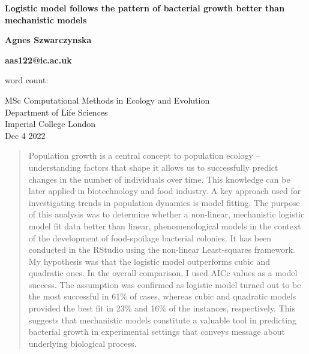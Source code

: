 \documentclass[a4paper,11pt]{article}
\newcommand{\quickwordcount}[1]{%
%
}
\begin{document}
\linespread{1.5}
\begin{titlepage}
    \begin{center}
        \vspace*{4cm}
            
        \Huge
        \textbf{Logistic model follows the pattern of bacterial growth better than mechanistic models}
            
        \vspace{0.5cm}
        \Large
            
        \vspace{1.5cm}
            
        \textbf{Agnes Szwarczynska}
        
        \textbf{aas122@ic.ac.uk}

        word count: \quickwordcount{MiniProject_Latex} 
            
        \vspace{5cm}
            
        \Large
        MSc Computational Methods in Ecology and Evolution\\
        Department of Life Sciences\\
        Imperial College London\\
        Dec 4 2022
            
    \end{center}
\end{titlepage}

\begin{abstract}
Population growth is a central concept to population ecology – understanding factors that shape it allows us to successfully predict changes in the number of individuals over time. This knowledge can be later applied in biotechnology and food industry. A key approach used for investigating trends in population dynamics is model fitting. The purpose of this analysis was to determine whether a non-linear, mechanistic logistic model fit data better than linear, phenomenological models in the context of the development of food-spoilage bacterial colonies. It has been conducted in the RStudio using the non-linear Least-squares framework. My hypothesis was that the logistic model outperforms cubic and quadratic ones. In the overall comparison, I used AICc values as a model success. The assumption was confirmed as logistic model turned out to be the most successful in 61\% of cases, whereas cubic and quadratic models provided the best fit in 23\% and 16\% of the instances, respectively. This suggests that mechanistic models constitute a valuable tool in predicting bacterial growth in experimental settings that conveys message about underlying biological process.
\end{abstract}
\end{document}

